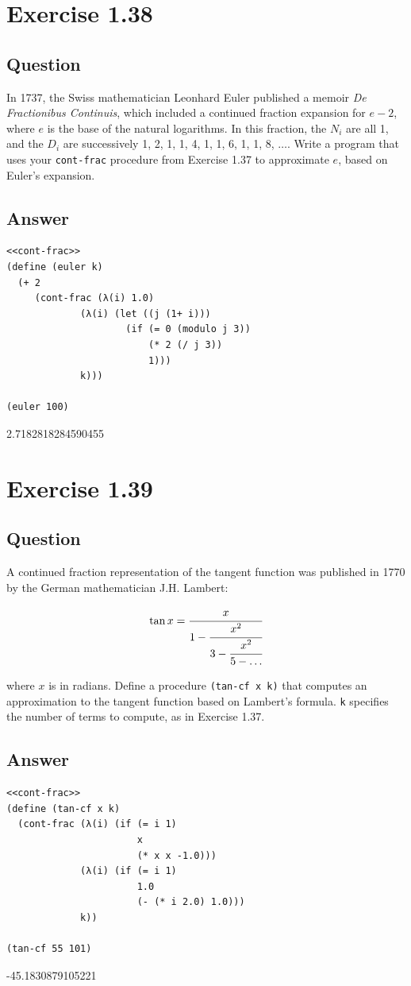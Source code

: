 \documentclass[final,fleqn,titlepage]{article}
\begin{document}
\section{Exercise 1.38}
\label{sec:org68fe162}
\subsection{Question}
\label{sec:org74f4265}
In 1737, the Swiss mathematician Leonhard Euler published a memoir \emph{De
Fractionibus Continuis}, which included a continued fraction expansion for \(e -
2\), where \(e\) is the base of the natural logarithms. In this fraction, the
\(N_i\) are all 1, and the \(D_i\) are successively 1, 2, 1, 1, 4, 1, 1, 6, 1,
1, 8, \(\dots\). Write a program that uses your \texttt{cont-frac} procedure from
Exercise 1.37 to approximate \(e\), based on Euler's expansion.
\subsection{Answer}
\label{sec:org7367bfd}
\begin{verbatim}
<<cont-frac>>
(define (euler k)
  (+ 2
     (cont-frac (λ(i) 1.0)
             (λ(i) (let ((j (1+ i)))
                     (if (= 0 (modulo j 3))
                         (* 2 (/ j 3))
                         1)))
             k)))

(euler 100)
\end{verbatim}

2.7182818284590455

\section{Exercise 1.39}
\label{sec:orga1a64a3}
\subsection{Question}
\label{sec:orgc93f9db}
A continued fraction representation of the tangent function was published in
1770 by the German mathematician J.H. Lambert:

\[ {\tan x} = \cfrac{x}{1 - \cfrac{x^2}{3 - \cfrac{x^2}{5 - \dots}}} \]

where \(x\) is in radians. Define a procedure \texttt{(tan-cf x k)} that
computes an approximation to the tangent function based on Lambert's formula.
\texttt{k} specifies the number of terms to compute, as in Exercise 1.37.
\subsection{Answer}
\label{sec:org83817bc}
\begin{verbatim}
<<cont-frac>>
(define (tan-cf x k)
  (cont-frac (λ(i) (if (= i 1)
                       x
                       (* x x -1.0)))
             (λ(i) (if (= i 1)
                       1.0
                       (- (* i 2.0) 1.0)))
             k))

(tan-cf 55 101)
\end{verbatim}

-45.1830879105221
\end{document}
